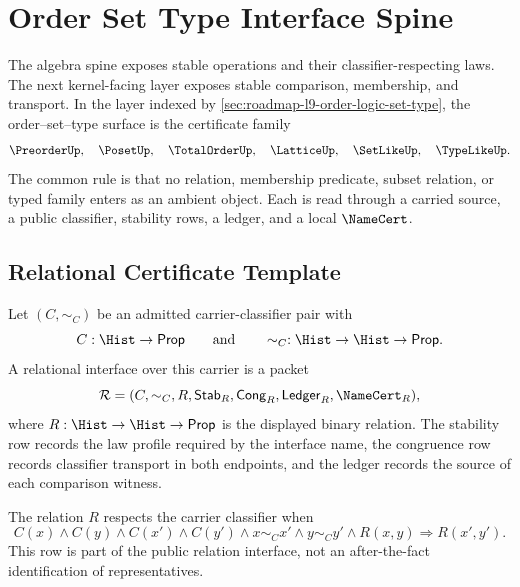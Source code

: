 \chapter{Order Set Type Interface Spine}
\label{ch:visions-order-set-type-interface-spine}

The algebra spine exposes stable operations and their classifier-respecting
laws.  The next kernel-facing layer exposes stable comparison, membership,
and transport.  In the layer indexed by
\autoref{sec:roadmap-l9-order-logic-set-type}, the order--set--type surface is
the certificate family
$$
\PreorderUp,\quad
\PosetUp,\quad
\TotalOrderUp,\quad
\LatticeUp,\quad
\SetLikeUp,\quad
\TypeLikeUp.
$$
The common rule is that no relation, membership predicate, subset relation,
or typed family enters as an ambient object.  Each is read through a carried
source, a public classifier, stability rows, a ledger, and a local
$\NameCert$.


\section{Relational Certificate Template}
\label{sec:order-set-type-relational-template}

\begin{definition}
\label{def:order-set-type-relational-interface}
Let $(C,\sim_C)$ be an admitted carrier-classifier pair with
$$
C:\Hist\to\mathsf{Prop}
\qquad\text{and}\qquad
\sim_C:\Hist\to\Hist\to\mathsf{Prop}.
$$
A relational interface over this carrier is a packet
$$
\mathcal R=(C,\sim_C,R,\mathsf{Stab}_R,
\mathsf{Cong}_R,\mathsf{Ledger}_R,\NameCert_R),
$$
where $R:\Hist\to\Hist\to\mathsf{Prop}$ is the displayed binary relation.
The stability row records the law profile required by the interface name,
the congruence row records classifier transport in both endpoints, and the
ledger records the source of each comparison witness.
\end{definition}

\begin{definition}
\label{def:order-set-type-relation-congruence}
The relation $R$ respects the carrier classifier when
$$
C(x)\wedge C(y)\wedge C(x')\wedge C(y')
\wedge x\sim_C x'\wedge y\sim_C y'\wedge R(x,y)
\Longrightarrow R(x',y').
$$
This row is part of the public relation interface, not an after-the-fact
identification of representatives.
\end{definition}

